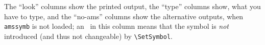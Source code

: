 The ``look'' columns show the printed output, the ``type'' columns show,
what you have to type, and the ``no-ams'' columns show the alternative
outputs, when \texttt{amssymb} is not loaded; an \Ast~in this column means
that the symbol is \emph{not} introduced (and thus not changeable) by
\verb=\SetSymbol=.





